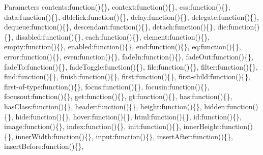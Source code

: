 \begin{DoxyParams}{Parameters}
\textquotesingle{}contents\textquotesingle{}\+:function()\{\}, \textquotesingle{}context\textquotesingle{}\+:function()\{\}, \textquotesingle{}css\textquotesingle{}\+:function()\{\}, \textquotesingle{}data\textquotesingle{}\+:function()\{\}, \textquotesingle{}dblclick\textquotesingle{}\+:function()\{\}, \textquotesingle{}delay\textquotesingle{}\+:function()\{\}, \textquotesingle{}delegate\textquotesingle{}\+:function()\{\}, \textquotesingle{}dequeue\textquotesingle{}\+:function()\{\}, \textquotesingle{}descendant\textquotesingle{}\+:function()\{\}, \textquotesingle{}detach\textquotesingle{}\+:function()\{\}, \textquotesingle{}die\textquotesingle{}\+:function()\{\}, \textquotesingle{}disabled\textquotesingle{}\+:function()\{\}, \textquotesingle{}each\textquotesingle{}\+:function()\{\}, \textquotesingle{}element\textquotesingle{}\+:function()\{\}, \textquotesingle{}empty\textquotesingle{}\+:function()\{\}, \textquotesingle{}enabled\textquotesingle{}\+:function()\{\}, \textquotesingle{}end\textquotesingle{}\+:function()\{\}, \textquotesingle{}eq\textquotesingle{}\+:function()\{\}, \textquotesingle{}error\textquotesingle{}\+:function()\{\}, \textquotesingle{}even\textquotesingle{}\+:function()\{\}, \textquotesingle{}fade\+In\textquotesingle{}\+:function()\{\}, \textquotesingle{}fade\+Out\textquotesingle{}\+:function()\{\}, \textquotesingle{}fade\+To\textquotesingle{}\+:function()\{\}, \textquotesingle{}fade\+Toggle\textquotesingle{}\+:function()\{\}, \textquotesingle{}file\textquotesingle{}\+:function()\{\}, \textquotesingle{}filter\textquotesingle{}\+:function()\{\}, \textquotesingle{}find\textquotesingle{}\+:function()\{\}, \textquotesingle{}finish\textquotesingle{}\+:function()\{\}, \textquotesingle{}first\textquotesingle{}\+:function()\{\}, \textquotesingle{}first-\/child\textquotesingle{}\+:function()\{\}, \textquotesingle{}first-\/of-\/type\textquotesingle{}\+:function()\{\}, \textquotesingle{}focus\textquotesingle{}\+:function()\{\}, \textquotesingle{}focusin\textquotesingle{}\+:function()\{\}, \textquotesingle{}focusout\textquotesingle{}\+:function()\{\}, \textquotesingle{}get\textquotesingle{}\+:function()\{\}, \textquotesingle{}gt\textquotesingle{}\+:function()\{\}, \textquotesingle{}has\textquotesingle{}\+:function()\{\}, \textquotesingle{}has\+Class\textquotesingle{}\+:function()\{\}, \textquotesingle{}header\textquotesingle{}\+:function()\{\}, \textquotesingle{}height\textquotesingle{}\+:function()\{\}, \textquotesingle{}hidden\textquotesingle{}\+:function()\{\}, \textquotesingle{}hide\textquotesingle{}\+:function()\{\}, \textquotesingle{}hover\textquotesingle{}\+:function()\{\}, \textquotesingle{}html\textquotesingle{}\+:function()\{\}, \textquotesingle{}id\textquotesingle{}\+:function()\{\}, \textquotesingle{}image\textquotesingle{}\+:function()\{\}, \textquotesingle{}index\textquotesingle{}\+:function()\{\}, \textquotesingle{}init\textquotesingle{}\+:function()\{\}, \textquotesingle{}inner\+Height\textquotesingle{}\+:function()\{\}, \textquotesingle{}inner\+Width\textquotesingle{}\+:function()\{\}, \textquotesingle{}input\textquotesingle{}\+:function()\{\}, \textquotesingle{}insert\+After\textquotesingle{}\+:function()\{\}, \textquotesingle{}insert\+Before\textquotesingle{}\+:function()\{\}, 
\end{DoxyParams}
